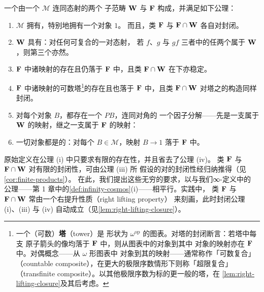 \begin{definition}[\trCategoryOfFibrantObjects]\label{def:category-of-fibrant-objects}
一个\textbf{\trCategoryOfFibrantObjects}由一个\trCategory{} $\mathcal{M}$ 连同态射的两个%
子范畴 $\mathbf{W}$ 与 $\mathbf{F}$ 构成，并满足如下公理：
\begin{enumerate}[label=(\roman*)]
\item $\mathcal{M}$ 拥有\trProduct{}，特别地拥有一个\trTerminal{}对象 $1$。
  而且，类 $\mathbf{F}$ 与 $\mathbf{F}\cap\mathbf{W}$ 各自对\trProduct{}封闭。
\item $\mathbf{W}$ 具有\textbf{\trTwoOfThreeProperty}：对任何可复合的一对态射，
  若 $f$、$g$ 与 $gf$ 三者中的任两个属于 $\mathbf{W}$，则第三个亦然。
\item $\mathbf{F}$ 中诸映射的\trPullback{}存在且仍落于 $\mathbf{F}$ 中，且类
  $\mathbf{F}\cap\mathbf{W}$ 在\trPullback{}下亦稳定。
\item $\mathbf{F}$ 中诸映射的可数塔\footnote{一个（可数）\textbf{塔}（tower）是
  形状为 $\omega^{\mathrm{op}}$ 的图表。对塔的\trLimit{}封闭断言：若塔中每支
  原子箭头的像均落于 $\mathbf{F}$ 中，则从图表中的\trLimit{}对象到其中%
  \trTerminal{}对象的映射亦在 $\mathbf{F}$ 中。对偶概念——从 $\omega$ 形图表中%
  \trInitial{}对象到其\trColimit{}的映射——通常称作「可数复合」
  （countable composite），在更大的极限序数情形下则称「超限复合」
  （transfinite composite）。以其他极限序数为标的更一般的塔，在%
  \cref{lem:right-lifting-closure}及其后考虑。}的\trLimit{}存在且也落于 $\mathbf{F}$ 中，且类 $\mathbf{F}\cap\mathbf{W}$
  对塔之\trLimit{}的构造同样封闭。
\item 对每个对象 $B$，都存在一个\textbf{\trPathObject} $PB$，连同对角的%
  一个因子分解——先是一支属于 $\mathbf{W}$ 的映射，继之一支属于 $\mathbf{F}$ 的映射：
  \begin{center}
  \end{center}
\item 一切对象都是\textbf{\trFibrant}{}的：对每个 $B\in\mathcal{M}$，映射
  $B\to 1$ 落于 $\mathbf{F}$ 中。
\end{enumerate}
\end{definition}

\begin{remark}\label{rem:original-definition}
原始定义在公理 (i) 中只要求有限\trProduct{}的存在性，并且省去了公理 (iv)。
类 $\mathbf{F}$ 与 $\mathbf{F}\cap\mathbf{W}$ 对有限\trProduct{}的封闭性，可由公理 (iii) 所
假设的对\trPullback{}的封闭性经归纳推得（见\cref{cor:finite-products}）。
在此，我们提出这些无穷\trLimit{}的要求，以与我们∞-\trInfinityCosmos{}定义中的%
\trLimit{}公理——第 1 章中的\cref{def:infinity-cosmos}(i)——相平行。实践中，
类 $\mathbf{F}$ 与 $\mathbf{F}\cap\mathbf{W}$ 常由一个右提升性质（right lifting property）
来刻画，此时封闭公理 (i)、(iii) 与 (iv) 自动成立（见\cref{lem:right-lifting-closure}）。
\end{remark}

